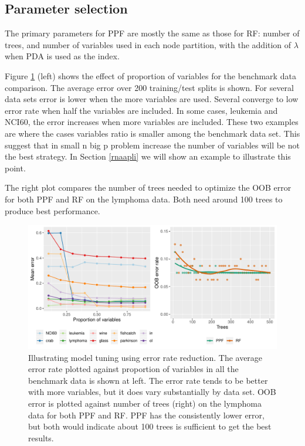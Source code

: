 \documentclass[12pt]{article}\usepackage[]{graphicx}\usepackage[]{color}
\makeatletter
\def\maxwidth{ %
  \ifdim\Gin@nat@width>\linewidth
    \linewidth
  \else
    \Gin@nat@width
  \fi
}
\newenvironment{knitrout}{}{} %
\makeatother
\begin{document}

\subsection{Parameter selection}

The primary parameters for PPF are mostly the same as those for RF: number of trees, and number of variables used in each node partition, with the addition of $\lambda$ when PDA is used as the index.

Figure \ref{parameters} (left) shows the effect of proportion of variables for the benchmark data comparison. The average error over 200 training/test splits is shown. For several data sets error is lower when the more variables are used. Several converge to low error rate when half the variables are included. In some cases, leukemia and NCI60, the error increases when more variables are included. These two examples are where the cases variables ratio is smaller among the benchmark data set. This suggest that in small n big p problem increase the number of variables will be not the best strategy. In Section \ref{rnaapli} we will show an example to illustrate this point.

The right plot compares the number of trees needed to optimize the OOB error for both PPF and RF on the lymphoma data. Both need around 100 trees to produce best performance.


\begin{figure}[!ht]
\centering

\end{figure}

\begin{figure}[!ht]
\centering
\begin{knitrout}
\color{fgcolor}
\includegraphics[width=\maxwidth]{figure/errorrate-1} 

\end{knitrout}
\caption{Illustrating model tuning using error rate reduction. The average error rate plotted against proportion of variables in all the benchmark data is shown at left. The error rate tends to be better with more variables, but it does vary substantially by data set. OOB error is plotted against number of trees (right) on the lymphoma data for both PPF and RF. PPF has the consistently lower error, but both would indicate about 100 trees is sufficient to get the best results. \label{parameters} }
\end{figure}
\end{document}

